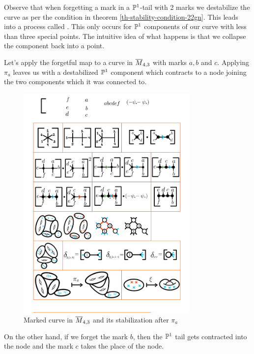 \documentclass[12pt]{memoir}
\begin{document}
\begin{Rmk}
    Observe that when forgetting a mark in a $\mathbb{P}^1$-tail with 2 marks we destabilize the curve as per the condition in theorem \ref{th-stability-condition-22gn}. This leads into a process called . This only occurs for $\mathbb{P}^1$ components of our curve with less than three special points. The intuitive idea of what happens is that we collapse the component back into a point.
\end{Rmk}

\begin{Ex}
    Let's apply the forgetful map to a curve in $\overline M_{4,3}$ with marks $a,b$ and $c$. Applying $\pi_a$ leaves us with a destabilized $\mathbb{P}^1$ component which contracts to a node joining the two components which it was connected to.
\begin{figure}[h!]
        \centering
        \includegraphics[width=0.8\textwidth, trim= 1.3cm 1.7cm 9cm 22.9cm,clip]{../figs/FigsDNnotability1.pdf}
        \caption{Marked curve in $\overline M_{4,3}$ and its stabilization after $\pi_a$}
        \label{fig:forget-mark-in-node}
    \end{figure}
On the other hand, if we forget the mark $b$, then the $\mathbb{P}^1$ tail gets contracted into the node and the mark $c$ takes the place of the node.

\end{Ex}
\end{document}
